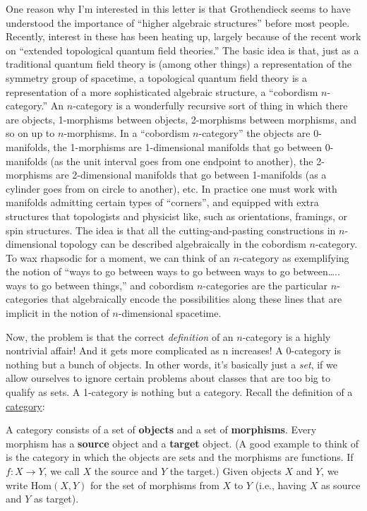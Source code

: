 \documentclass{article}
\begin{document}
One reason why I'm interested in this letter is that Grothendieck seems
to have understood the importance of ``higher algebraic structures''
before most people. Recently, interest in these has been heating up,
largely because of the recent work on ``extended topological quantum
field theories.'' The basic idea is that, just as a traditional quantum
field theory is (among other things) a representation of the symmetry
group of spacetime, a topological quantum field theory is a
representation of a more sophisticated algebraic structure, a
``cobordism \(n\)-category.'' An \(n\)-category is a wonderfully
recursive sort of thing in which there are objects, 1-morphisms between
objects, 2-morphisms between morphisms, and so on up to \(n\)-morphisms.
In a ``cobordism \(n\)-category'' the objects are 0-manifolds, the
1-morphisms are 1-dimensional manifolds that go between 0-manifolds (as
the unit interval goes from one endpoint to another), the 2-morphisms
are 2-dimensional manifolds that go between 1-manifolds (as a cylinder
goes from on circle to another), etc. In practice one must work with
manifolds admitting certain types of ``corners'', and equipped with
extra structures that topologists and physicist like, such as
orientations, framings, or spin structures. The idea is that all the
cutting-and-pasting constructions in \(n\)-dimensional topology can be
described algebraically in the cobordism \(n\)-category. To wax
rhapsodic for a moment, we can think of an \(n\)-category as
exemplifying the notion of ``ways to go between ways to go between ways
to go between\ldots.. ways to go between things,'' and cobordism
\(n\)-categories are the particular \(n\)-categories that algebraically
encode the possibilities along these lines that are implicit in the
notion of \(n\)-dimensional spacetime.

Now, the problem is that the correct \emph{definition} of an
\(n\)-category is a highly nontrivial affair! And it gets more
complicated as n increases! A 0-category is nothing but a bunch of
objects. In other words, it's basically just a \emph{set}, if we allow
ourselves to ignore certain problems about classes that are too big to
qualify as sets. A 1-category is nothing but a category. Recall the
definition of a
\href{http://math.ucr.edu/home/baez/categories.html}{category}:

A category consists of a set of \textbf{objects} and a set of
\textbf{morphisms}. Every morphism has a \textbf{source} object and a
\textbf{target} object. (A good example to think of is the category in
which the objects are sets and the morphisms are functions. If
\(f\colon X\to Y\), we call \(X\) the source and \(Y\) the target.)
Given objects \(X\) and \(Y\), we write \(\mathrm{Hom}(X,Y)\) for the
set of morphisms from \(X\) to \(Y\) (i.e., having \(X\) as source and
\(Y\) as target).
\end{document}
